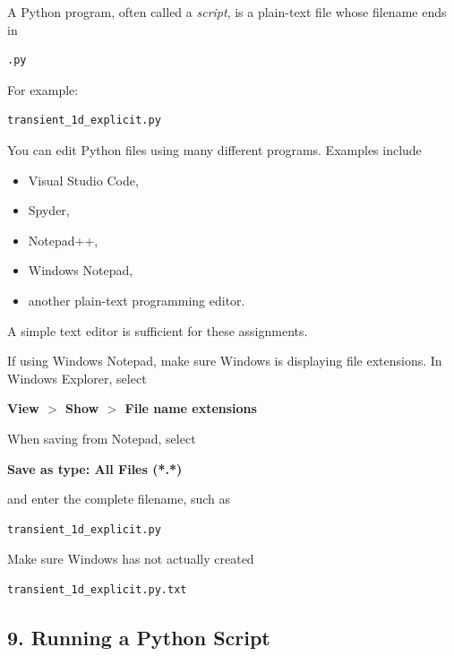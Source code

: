 \documentclass[11pt]{article}
\begin{document}
A Python program, often called a \textit{script}, is a plain-text file
whose filename ends in

\begin{lstlisting}
.py
\end{lstlisting}

For example:

\begin{lstlisting}
transient_1d_explicit.py
\end{lstlisting}

You can edit Python files using many different programs. Examples
include

\begin{itemize}
    \item Visual Studio Code,
    \item Spyder,
    \item Notepad++,
    \item Windows Notepad,
    \item another plain-text programming editor.
\end{itemize}

A simple text editor is sufficient for these assignments.

If using Windows Notepad, make sure Windows is displaying file
extensions. In Windows Explorer, select

\begin{center}
\textbf{View $>$ Show $>$ File name extensions}
\end{center}

When saving from Notepad, select

\begin{center}
\textbf{Save as type: All Files (*.*)}
\end{center}

and enter the complete filename, such as

\begin{lstlisting}
transient_1d_explicit.py
\end{lstlisting}

Make sure Windows has not actually created

\begin{lstlisting}
transient_1d_explicit.py.txt
\end{lstlisting}

\subsection*{9. Running a Python Script}
\end{document}
